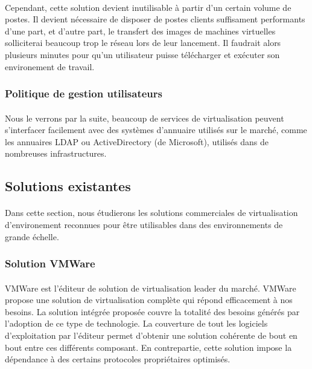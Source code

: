 \paragraph{} Cependant, cette solution devient inutilisable à partir d'un
certain volume de postes. Il devient nécessaire de disposer de postes clients
suffisament performants d'une part, et d'autre part, le transfert des images de
machines virtuelles solliciterai beaucoup trop le réseau lors de leur lancement.
Il faudrait alors plusieurs minutes pour qu'un utilisateur puisse télécharger et
exécuter son environement de travail.

\subsubsection{Politique de gestion utilisateurs}

\paragraph{} Nous le verrons par la suite, beaucoup de services de
virtualisation peuvent s'interfacer facilement avec des systèmes d'annuaire
utilisés sur le marché, comme les annuaires LDAP ou ActiveDirectory (de
Microsoft), utilisés dans de nombreuses infrastructures.


\subsection{Solutions existantes}

\paragraph{} Dans cette section, nous étudierons les solutions commerciales de virtualisation d'environement reconnues pour être utilisables
dans des environnements de grande échelle.

\subsubsection{Solution VMWare}

\paragraph{} VMWare est l'éditeur de solution de virtualisation leader du
marché. VMWare propose une solution de virtualisation complète qui répond
efficacement à nos besoins. La solution intégrée proposée couvre la totalité des
besoins générés par l'adoption de ce type de technologie. La couverture de tout
les logiciels d'exploitation par l'éditeur permet d'obtenir une solution
cohérente de bout en bout entre ces différents composant. En contrepartie, cette
solution impose la dépendance à des certains protocoles propriétaires optimisés.

